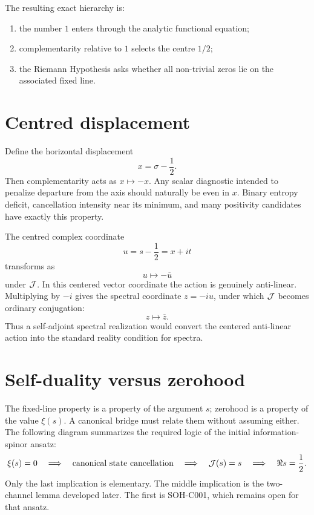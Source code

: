 The resulting exact hierarchy is:
\begin{enumerate}
  \item the number $1$ enters through the analytic functional equation;
  \item complementarity relative to $1$ selects the centre $1/2$;
  \item the Riemann Hypothesis asks whether all non-trivial zeros lie on the associated fixed line.
\end{enumerate}

\section{Centred displacement}

Define the horizontal displacement
\begin{equation}
 x=\sigma-\frac12.
 \label{eq:x-displacement}
\end{equation}
Then complementarity acts as $x\mapsto-x$. Any scalar diagnostic intended to penalize departure from the axis should naturally be even in $x$. Binary entropy deficit, cancellation intensity near its minimum, and many positivity candidates have exactly this property.

The centred complex coordinate
\[
 u=s-\frac12=x+it
\]
transforms as
\[
 u\mapsto-\overline{u}
\]
under $\mathcal{J}$. In this centered vector coordinate the action is genuinely anti-linear. Multiplying by $-i$ gives the spectral coordinate $z=-iu$, under which $\mathcal{J}$ becomes ordinary conjugation:
\[
 z\mapsto\overline{z}.
\]
Thus a self-adjoint spectral realization would convert the centered anti-linear action into the standard reality condition for spectra.

\section{Self-duality versus zerohood}

The fixed-line property is a property of the argument $s$; zerohood is a property of the value $\xi(s)$. A canonical bridge must relate them without assuming either. The following diagram summarizes the required logic of the initial information-spinor ansatz:
\[
 \xi(s)=0
 \quad\Longrightarrow\quad
 \text{canonical state cancellation}
 \quad\Longrightarrow\quad
 \mathcal{J}(s)=s
 \quad\Longrightarrow\quad
 \Re s=\frac12.
\]
Only the last implication is elementary. The middle implication is the two-channel lemma developed later. The first is SOH-C001, which remains open for that ansatz.

